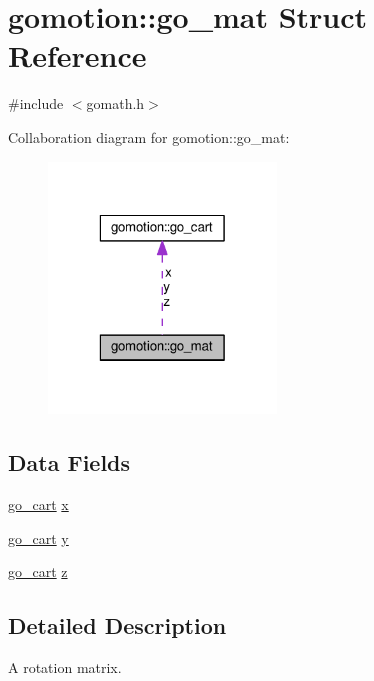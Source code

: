 \hypertarget{structgomotion_1_1go__mat}{\section{gomotion\-:\-:go\-\_\-mat Struct Reference}
\label{structgomotion_1_1go__mat}
}


{\ttfamily \#include $<$gomath.\-h$>$}



Collaboration diagram for gomotion\-:\-:go\-\_\-mat\-:\nopagebreak
\begin{figure}[H]
\begin{center}
\leavevmode
\includegraphics[width=172pt]{dd/d7f/structgomotion_1_1go__mat__coll__graph}
\end{center}
\end{figure}
\subsection*{Data Fields}
\begin{DoxyCompactItemize}
\item 
\hyperlink{structgomotion_1_1go__cart}{go\-\_\-cart} \hyperlink{structgomotion_1_1go__mat_a53b13939d829ceb25ad338899cc41ebb}{x}
\item 
\hyperlink{structgomotion_1_1go__cart}{go\-\_\-cart} \hyperlink{structgomotion_1_1go__mat_a77d00fb0a019de108943dc3510db99d7}{y}
\item 
\hyperlink{structgomotion_1_1go__cart}{go\-\_\-cart} \hyperlink{structgomotion_1_1go__mat_ab6b8b051c8695a4a07da09a4b76da95e}{z}
\end{DoxyCompactItemize}


\subsection{Detailed Description}
A rotation matrix. 

